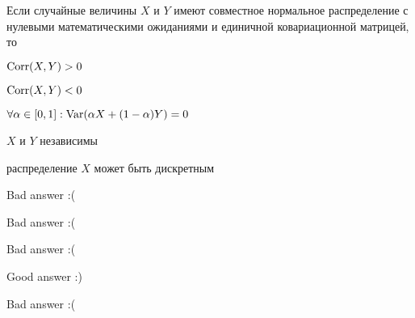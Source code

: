 
\begin{question}
Если случайные величины \(X\) и \(Y\) имеют совместное нормальное
распределение с нулевыми математическими ожиданиями и единичной
ковариационной матрицей, то
\begin{answerlist}
  \item \(\operatorname{Corr}(X,Y)>0\)
  \item \(\operatorname{Corr}(X,Y)<0\)
  \item \(\forall \alpha \in [0,1]: \operatorname{Var}(\alpha X + (1-\alpha)Y) = 0\)
  \item \(X\) и \(Y\) независимы
  \item распределение \(X\) может быть дискретным
\end{answerlist}
\end{question}

\begin{solution}
\begin{answerlist}
  \item Bad answer :(
  \item Bad answer :(
  \item Bad answer :(
  \item Good answer :)
  \item Bad answer :(
\end{answerlist}
\end{solution}

